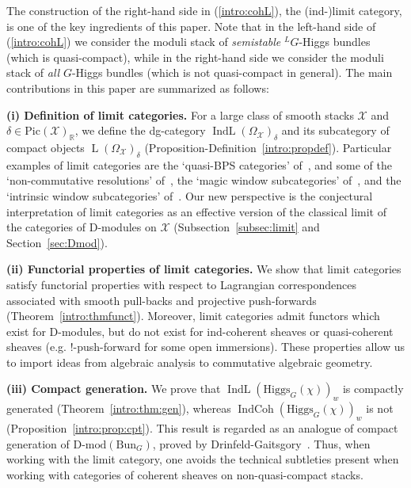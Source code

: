 \documentclass [11pt,oneside,a4paper,mathscr]{amsart}
\theoremstyle{definition}
\newcommand{\LL}{\operatorname{L}}
\newcommand{\X}{\mathcal{X}}
\newcommand{\IndCoh}{\operatorname{IndCoh}}
\newcommand{\IndL}{\operatorname{IndL}}
\newcommand{\Hig}{\mathrm{Higgs}}
\newcommand{\Bun}{\mathrm{Bun}}
\begin{document}
The construction of the right-hand side in (\ref{intro:cohL}), the (ind-)limit category, 
is one of the key ingredients of this paper. Note that in the left-hand side
of (\ref{intro:cohL}) we consider the moduli stack of \textit{semistable} $^{L}G$-Higgs bundles (which is quasi-compact), 
while in the right-hand side we consider the moduli stack of \textit{all} $G$-Higgs bundles (which is not quasi-compact in general). The main contributions in this paper are summarized as follows: 

\vspace{2mm}

{\bf (i) Definition of limit categories.} For a large class of smooth stacks $\X$ and $\delta \in \mathrm{Pic}(\X)_{\mathbb{R}}$, we define the dg-category $\IndL(\Omega_{\X})_{\delta}$ and its subcategory of compact objects $\LL(\Omega_{\X})_{\delta}$ (Proposition-Definition~\ref{intro:propdef}). 
Particular examples of limit categories are the `quasi-BPS categories' of~\cite{PThiggs}, and some of the `non-commutative resolutions' of~\cite{SvdB},
the `magic window subcategories' of~\cite{hls}, and the `intrinsic window subcategories' of~\cite{T}.
Our new perspective is the conjectural interpretation of limit categories as 
an effective version of the classical limit of the categories of D-modules on $\X$ (Subsection~\ref{subsec:limit} and Section~\ref{sec:Dmod}). 

    \vspace{2mm}

{\bf (ii) Functorial properties of limit categories.}
We show that limit categories satisfy functorial properties with 
respect to Lagrangian correspondences associated with smooth pull-backs and projective push-forwards
(Theorem~\ref{intro:thmfunct}). Moreover, limit categories admit functors which exist for D-modules, 
but do not exist for ind-coherent sheaves or quasi-coherent sheaves (e.g. ${!}$-push-forward for some open immersions). These properties allow us to import ideas from algebraic analysis to commutative algebraic geometry. 


\vspace{2mm}

   {\bf (iii) Compact generation.} We prove that $\IndL(\Hig_G(\chi))_w$ is compactly generated (Theorem~\ref{intro:thm:gen}), whereas $\IndCoh(\Hig_G(\chi))_w$ is not (Proposition~\ref{intro:prop:cpt}). This result is regarded as an analogue of compact generation of $\text{D-mod}(\Bun_G)$, proved by Drinfeld-Gaitsgory~\cite{DGbun}. Thus, when working with the limit category, one avoids
   the technical subtleties 
   present when working with categories of coherent sheaves on non-quasi-compact stacks. 
\end{document}
